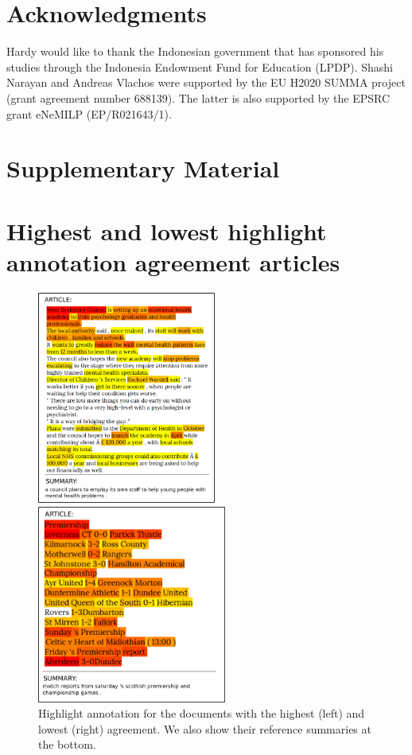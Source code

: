 \documentclass[11pt,a4paper]{article}
\begin{document}
\section*{Acknowledgments}

Hardy would like to thank the Indonesian government that
has sponsored his studies through
the Indonesia Endowment Fund for Education
(LPDP). Shashi Narayan and Andreas Vlachos were supported by the
EU H2020 SUMMA project (grant agreement
number 688139). The latter is also supported by the EPSRC grant eNeMILP
(EP/R021643/1).




\onecolumn
\newpage
\setcounter{section}{0}
\setcounter{figure}{0}
\setcounter{table}{0}
\section*{Supplementary Material}
\section{Highest and lowest highlight annotation agreement articles}
\begin{figure}[ht!]
    \centering
    \begin{minipage}{.45\textwidth}
    \centering
    \includegraphics[height=7cm]{heatmap_best}
    \end{minipage}
    \begin{minipage}{.45\textwidth}
    \centering
    \includegraphics[height=6.5cm]{heatmap_negative}
    \end{minipage}
    \caption{Highlight annotation for the documents with the highest (left) and lowest (right) agreement. We also show their reference summaries at the bottom.}
  \label{image:heatmap_both}
\end{figure}
\newpage
\end{document}
